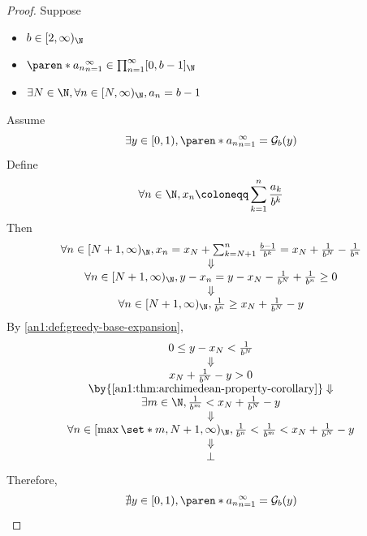 \begin{proof}
  Suppose
  \begin{itemize}
    \item $b \in [2, \infty)_{\N}$
    \item $\paren*{a_{n}}_{n = 1}^{\infty} \in \prod_{n = 1}^{\infty} [0, b - 1]_{\N}$
    \item $\exists N \in \N, \forall n \in [N, \infty)_{\N}, a_{n} = b - 1$
  \end{itemize}
  Assume
  \[
    \exists y \in [0, 1), \paren*{a_{n}}_{n = 1}^{\infty} = \mathcal{G}_{b}(y)
  \]
  Define
  \[
    \forall n \in \N, x_{n} \coloneqq \sum_{k = 1}^{n} \frac{a_{k}}{b^{k}}
  \]
  Then
  \[
    \begin{array}{c}
      \forall n \in [N + 1, \infty)_{\N}, x_{n} = x_{N} + \sum_{k = N + 1}^{n}
      \frac{b - 1}{b^{k}} = x_{N} + \frac{1}{b^{N}} - \frac{1}{b^{n}}                                       \\
      \Downarrow                                                                                            \\
      \forall n \in [N + 1, \infty)_{\N},  y - x_{n} = y - x_{N} - \frac{1}{b^{N}} + \frac{1}{b^{n}} \geq 0 \\
      \Downarrow                                                                                            \\
      \forall n \in [N + 1, \infty)_{\N},  \frac{1}{b^{n}} \geq x_{N} + \frac{1}{b^{N}} - y
    \end{array}
  \]
  By \cref{an1:def:greedy-base-expansion},
  \[
    \begin{array}{c}
      0 \leq y - x_{N} < \frac{1}{b^{N}}                               \\
      \Downarrow                                                       \\
      x_{N} + \frac{1}{b^{N}} - y > 0                                  \\
      \by{\Cref{an1:thm:archimedean-property-corollary}} \Downarrow    \\
      \exists m \in \N, \frac{1}{b^{m}} < x_{N} + \frac{1}{b^{N}} - y  \\
      \Downarrow                                                       \\
      \forall n \in [\max{\set*{m, N}} + 1, \infty)_{\N},
      \frac{1}{b^{n}} < \frac{1}{b^{m}} <  x_{N} + \frac{1}{b^{N}} - y \\
      \Downarrow                                                       \\
      \bot
    \end{array}
  \]
  Therefore,
  \[
    \nexists y \in [0, 1), \paren*{a_{n}}_{n = 1}^{\infty} = \mathcal{G}_{b}(y)
  \]
\end{proof}
